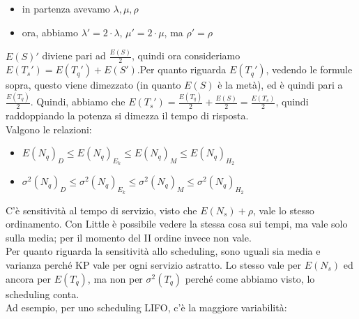 \documentclass{article}
\begin{document}
\begin{itemize}
\item in partenza avevamo $\lambda, \mu, \rho$
\item ora, abbiamo $\lambda' = 2\cdot \lambda$, $\mu' = 2\cdot \mu$, ma $\rho' = \rho$
\end{itemize}
$E(S)'$ diviene pari ad $\frac{E(S)}{2}$, quindi ora consideriamo $E(T_s') = E(T_q') + E(S')$.Per quanto riguarda $E(T_q')$, vedendo le formule sopra, questo viene dimezzato (in quanto $E(S)$ è la metà), ed è quindi pari a $\frac{E(T_q)}{2}$. Quindi, abbiamo che $E(T_s') = \frac{E(T_q)}{2} + \frac{E(S)}{2} = \frac{E(T_s)}{2}$, quindi raddoppiando la potenza si dimezza il tempo di risposta.\\ Valgono le relazioni:
\begin{itemize}
\item $E(N_q)_D \leq E(N_q)_{E_k} \leq E(N_q)_M \leq E(N_q)_{H_2}$
\item $\sigma^2(N_q)_D \leq \sigma^2(N_q)_{E_k} \leq \sigma^2(N_q)_M \leq \sigma^2(N_q)_{H_2}$
\end{itemize}
C'è sensitività al tempo di servizio, visto che $E(N_s) + \rho$, vale lo stesso ordinamento. Con Little è possibile vedere la stessa cosa sui tempi, ma vale solo sulla media; per il momento del II ordine invece non vale.\\ Per quanto riguarda la sensitività allo scheduling, sono uguali sia media e varianza perché KP vale per ogni servizio astratto. Lo stesso vale per $E(N_s)$ ed ancora per $E(T_q)$, ma non per $\sigma^2(T_q)$ perché come abbiamo visto, lo scheduling conta.\\ Ad esempio, per uno scheduling LIFO, c'è la maggiore variabilità:\\
\end{document}
